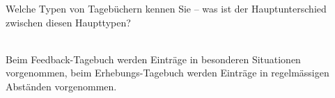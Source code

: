 \begin{exercise}
  Welche Typen von Tagebüchern kennen Sie -- was ist der Hauptunterschied zwischen diesen Haupttypen?
  \\\\
\end{exercise}
Beim Feedback-Tagebuch werden Einträge in besonderen Situationen vorgenommen,
beim Erhebungs-Tagebuch werden Einträge in regelmässigen Abständen vorgenommen.